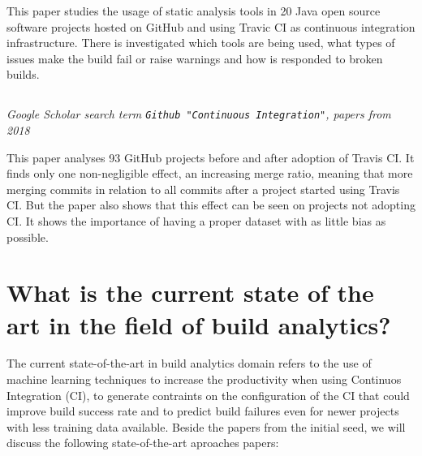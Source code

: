 \documentclass[]{book}
\begin{document}
This paper studies the usage of static analysis tools in 20 Java open
source software projects hosted on GitHub and using Travic CI as
continuous integration infrastructure. There is investigated which tools
are being used, what types of issues make the build fail or raise
warnings and how is responded to broken builds.

\subsection{\texorpdfstring{\citet{baltes2018no}}{@baltes2018no}}\label{baltes2018no}

\emph{Google Scholar search term
\texttt{Github\ "Continuous\ Integration"}, papers from 2018}

This paper analyses 93 GitHub projects before and after adoption of
Travis CI. It finds only one non-negligible effect, an increasing merge
ratio, meaning that more merging commits in relation to all commits
after a project started using Travis CI. But the paper also shows that
this effect can be seen on projects not adopting CI. It shows the
importance of having a proper dataset with as little bias as possible.

\section{What is the current state of the art in the field of build
analytics?}\label{what-is-the-current-state-of-the-art-in-the-field-of-build-analytics}

The current state-of-the-art in build analytics domain refers to the use
of machine learning techniques to increase the productivity when using
Continuos Integration (CI), to generate contraints on the configuration
of the CI that could improve build success rate and to predict build
failures even for newer projects with less training data available.
Beside the papers from the initial seed, we will discuss the following
state-of-the-art aproaches papers:

\subsection{\texorpdfstring{\citet{bisong2017built}}{@bisong2017built}}\label{bisong2017built}
\end{document}

